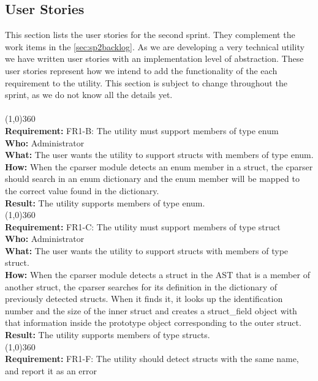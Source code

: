 \subsection{User Stories}

This section lists the user stories for the second sprint. They complement the work items in the \ref{sec:sp2backlog}. 
As we are developing a very technical utility we have written user stories with an implementation level of abstraction. 
These user stories represent how we intend to add the functionality of the each requirement to the utility.
This section is subject to change throughout the sprint, as we do not know all the details yet.\\
\\
\line(1,0){360}\\
\textbf{Requirement:} FR1-B: The utility must support members of type enum\\
\textbf{Who:} Administrator\\
\textbf{What:} The user wants the utility to support structs with members of type enum.\\
\textbf{How:} When the cparser module detects an enum member in a struct, the cparser should search in an enum dictionary and the enum member will be mapped to the correct value found in the dictionary. \\
\textbf{Result:} The utility supports members of type enum.\\
\line(1,0){360}\\
\textbf{Requirement:} FR1-C: The utility must support members of type struct\\
\textbf{Who:} Administrator\\
\textbf{What:} The user wants the utility to support structs with members of type struct. \\
\textbf{How:} When the cparser module detects a struct in the AST that is a member of another struct, the cparser searches for its definition in the dictionary of previously detected structs. When it finds it, it looks up the identification number and the size of the inner struct and creates a struct\_field object with that information inside the prototype object corresponding to the outer struct.\\
\textbf{Result:} The utility supports members of type structs.\\
\line(1,0){360}\\
\textbf{Requirement:} FR1-F: The utility should detect structs with the same name, and report it as an error\\
